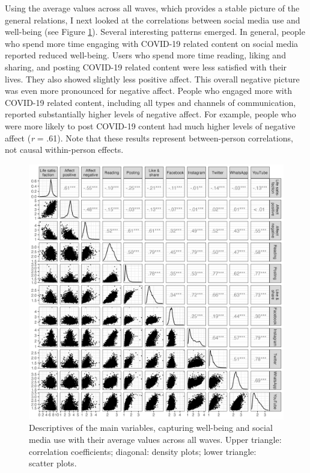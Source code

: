 \documentclass[
  man,mask,floatsintext]{apa7}
\begin{document}
Using the average values across all waves, which provides a stable picture of the general relations, I next looked at the correlations between social media use and well-being (see Figure \ref{fig:fig-correlations}).
Several interesting patterns emerged.
In general, people who spend more time engaging with COVID-19 related content on social media reported reduced well-being.
Users who spend more time reading, liking and sharing, and posting COVID-19 related content were less satisfied with their lives.
They also showed slightly less positive affect.
This overall negative picture was even more pronounced for negative affect.
People who engaged more with COVID-19 related content, including all types and channels of communication, reported substantially higher levels of negative affect.
For example, people who were more likely to post COVID-19 content had much higher levels of negative affect (\emph{r} = .61).
Note that these results represent between-person correlations, not causal within-person effects.

\begin{figure}
\includegraphics[width=\textwidth]{figures/fig_cor} \caption{Descriptives of the main variables, capturing well-being and social media use with their average values across all waves. Upper triangle: correlation coefficients; diagonal: density plots; lower triangle: scatter plots.}\label{fig:fig-correlations}
\end{figure}
\end{document}
